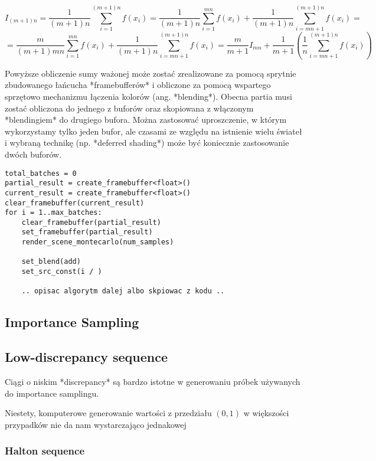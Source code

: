 \documentclass[../main.tex]{subfiles}
\begin{document}
$$
I_{(m+1)n} = \frac{1}{(m+1)n} \sum_{i=1}^{(m+1)n} f(x_i)
= \frac{1}{(m+1)n} \sum_{i=1}^{mn} f(x_i)
    + \frac{1}{(m+1)n} \sum_{i=mn+1}^{(m+1)n} f(x_i) =
$$
$$
= \frac{m}{(m+1)mn} \sum_{i=1}^{mn} f(x_i)
    + \frac{1}{(m+1)n} \sum_{i=mn+1}^{(m+1)n} f(x_i)
= \frac{m}{m+1}I_{mn}
    + \frac{1}{m+1} \left(
        \frac{1}{n} \sum_{i=mn+1}^{(m+1)n} f(x_i)
    \right)
$$

Powyższe obliczenie sumy ważonej może zostać zrealizowane za pomocą sprytnie
zbudowanego łańcucha *framebufferów* i obliczone za pomocą wspartego sprzętowo
mechanizmu łączenia kolorów (ang. *blending*). Obecna partia musi zostać
obliczona do jednego z buforów oraz skopiowana z włączonym *blendingiem* do
drugiego bufora. Można zastosować uproszczenie, w którym wykorzystamy tylko
jeden bufor, ale czasami ze względu na istnienie wielu świateł i wybraną
technikę (np. *deferred shading*) może być koniecznie zastosowanie dwóch
buforów.

\begin{lstlisting}
total_batches = 0
partial_result = create_framebuffer<float>()
current_result = create_framebuffer<float>()
clear_framebuffer(current_result)
for i = 1..max_batches:
    clear_framebuffer(partial_result)
    set_framebuffer(partial_result)
    render_scene_montecarlo(num_samples)

    set_blend(add)
    set_src_const(i / )

    .. opisac algorytm dalej albo skpiowac z kodu ..
\end{lstlisting}

\subsection{Importance Sampling}

\subsection{Low-discrepancy sequence}

Ciągi o niskim *discrepancy* są bardzo istotne w generowaniu próbek używanych
do importance samplingu.

Niestety, komputerowe generowanie wartości z przedziału $(0,1)$ w większości
przypadków nie da nam wystarczająco jednakowej

\subsubsection{Halton sequence}
\end{document}
